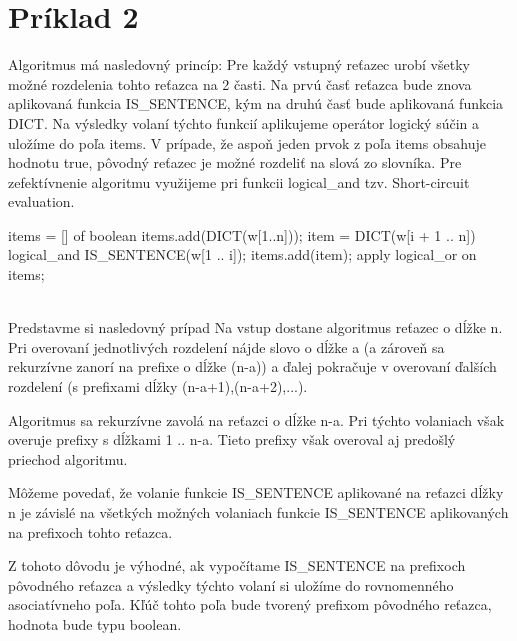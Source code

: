 \documentclass[paper=a4, fontsize=11pt]{scrartcl} %
\numberwithin{equation}{section} %
\numberwithin{figure}{section} %
\numberwithin{table}{section} %
\begin{document}
\pagebreak


\section*{Príklad 2}

Algoritmus má nasledovný princíp:
Pre každý vstupný reťazec urobí všetky možné rozdelenia tohto reťazca na 2 časti.
Na prvú časť reťazca bude znova aplikovaná funkcia IS\_SENTENCE, kým na druhú časť bude aplikovaná funkcia DICT.
Na výsledky volaní týchto funkcií aplikujeme operátor logický súčin a uložíme do poľa items.
V prípade, že aspoň jeden prvok z poľa items obsahuje hodnotu true, pôvodný reťazec je možné rozdeliť na slová zo slovníka.
Pre zefektívnenie algoritmu využijeme pri funkcii logical_and tzv. Short-circuit evaluation.



\begin{algorithmic}[1]
        \State items = [] of boolean
        \State items.add(DICT(w[1..n]));
        	\State item = DICT(w[i + 1 .. n]) logical\_and IS\_SENTENCE(w[1 .. i]);
		\State items.add(item);
        \EndFor
        \State \Return apply logical\_or on items;
    \EndFunction
\end{algorithmic}
\ \\

Predstavme si nasledovný prípad
Na vstup dostane algoritmus reťazec o dĺžke n.
Pri overovaní jednotlivých rozdelení nájde slovo o dĺžke a (a zároveň sa rekurzívne zanorí na prefixe o dĺžke (n-a)) a ďalej pokračuje v overovaní ďalších rozdelení (s prefixami dĺžky (n-a+1),(n-a+2),...).

Algoritmus sa rekurzívne zavolá na reťazci o dĺžke n-a.
Pri týchto volaniach však overuje prefixy s dĺžkami 1 .. n-a. Tieto prefixy však overoval aj predošlý priechod algoritmu.

Môžeme povedať, že volanie funkcie IS\_SENTENCE aplikované na reťazci dĺžky n je závislé na všetkých možných volaniach funkcie IS\_SENTENCE aplikovaných na prefixoch tohto reťazca.

Z tohoto dôvodu je výhodné, ak vypočítame IS\_SENTENCE na prefixoch pôvodného reťazca a výsledky týchto volaní si uložíme do rovnomenného asociatívneho poľa.
Kľúč tohto poľa bude tvorený prefixom pôvodného reťazca, hodnota bude typu boolean.
\end{document}
